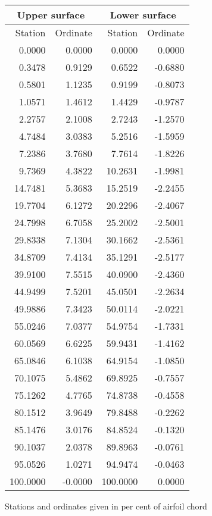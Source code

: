 \documentclass[11pt]{book}
\begin{document}
 \hspace{4mm}
 \begin{tabular}{|r|r|r|r|} \hline 
 \multicolumn{2}{|c|}{Upper surface} & \multicolumn{2}{|c|}{Lower surface} \\
 \hline
 Station & Ordinate & Station & Ordinate \\
 \hline
0.0000 & 0.0000 & 0.0000 & 0.0000 \\
0.3478 & 0.9129 & 0.6522 & -0.6880 \\
0.5801 & 1.1235 & 0.9199 & -0.8073 \\
1.0571 & 1.4612 & 1.4429 & -0.9787 \\
2.2757 & 2.1008 & 2.7243 & -1.2570 \\
4.7484 & 3.0383 & 5.2516 & -1.5959 \\
7.2386 & 3.7680 & 7.7614 & -1.8226 \\
9.7369 & 4.3822 & 10.2631 & -1.9981 \\
14.7481 & 5.3683 & 15.2519 & -2.2455 \\
19.7704 & 6.1272 & 20.2296 & -2.4067 \\
24.7998 & 6.7058 & 25.2002 & -2.5001 \\
29.8338 & 7.1304 & 30.1662 & -2.5361 \\
34.8709 & 7.4134 & 35.1291 & -2.5177 \\
39.9100 & 7.5515 & 40.0900 & -2.4360 \\
44.9499 & 7.5201 & 45.0501 & -2.2634 \\
49.9886 & 7.3423 & 50.0114 & -2.0221 \\
55.0246 & 7.0377 & 54.9754 & -1.7331 \\
60.0569 & 6.6225 & 59.9431 & -1.4162 \\
65.0846 & 6.1038 & 64.9154 & -1.0850 \\
70.1075 & 5.4862 & 69.8925 & -0.7557 \\
75.1262 & 4.7765 & 74.8738 & -0.4558 \\
80.1512 & 3.9649 & 79.8488 & -0.2262 \\
85.1476 & 3.0176 & 84.8524 & -0.1320 \\
90.1037 & 2.0378 & 89.8963 & -0.0761 \\
95.0526 & 1.0271 & 94.9474 & -0.0463 \\
100.0000 & -0.0000 & 100.0000 & 0.0000 \\
 \hline 
 \end{tabular}
 \vspace{8mm}

Stations and ordinates given in per cent of airfoil chord
\end{document}
